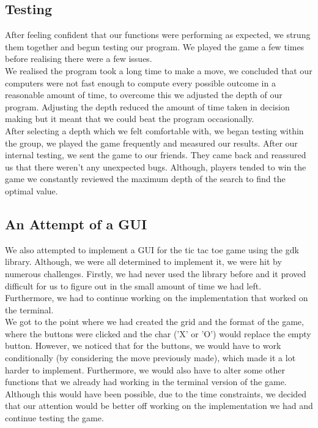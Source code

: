 \documentclass[10pt]{article}
\begin{document}
\subsection{Testing}
After feeling confident that our functions were performing as expected, we strung them together and begun testing our program. We played the game a few times before realising there were a few issues.
\\We realised the program took a long time to make a move, we concluded that our computers were not fast enough to compute every possible outcome in a reasonable amount of time, to overcome this we adjusted the depth of our program. Adjusting the depth reduced the amount of time taken in decision making but it meant that we could beat the program occasionally. 
\\After selecting a depth which we felt comfortable with, we began testing within the group, we played the game frequently and measured our results. After our internal testing, we sent the game to our friends. They came back and reassured us that there weren't any unexpected bugs. Although, players tended to win the game we constantly reviewed the maximum depth of the search to find the optimal value.

\subsection{An Attempt of a GUI}
We also attempted to implement a GUI for the tic tac toe game using the gdk library. Although, we were all determined to implement it, we were hit by numerous challenges. Firstly, we had never used the library before and it proved difficult for us to figure out in the small amount of time we had left. Furthermore, we had to continue working on the implementation that worked on the terminal.
\\We got to the point where we had created the grid and the format of the game, where the buttons were clicked and the char ('X' or 'O') would replace the empty button. However, we noticed that for the buttons, we would have to work conditionally (by considering the move previously made), which made it a lot harder to implement. Furthermore, we would also have to alter some other functions that we already had working in the terminal version of the game. Although this would have been possible, due to the time constraints, we decided that our attention would be better off working on the implementation we had and continue testing the game. 
\end{document}
